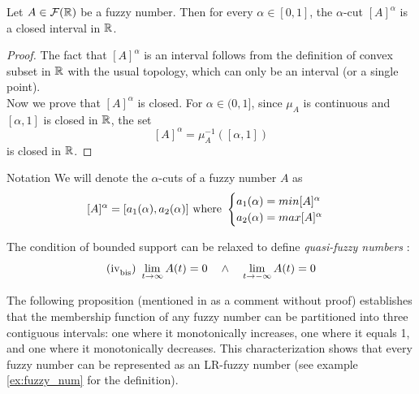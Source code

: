 \begin{proposition}
    Let $A\in \fuzzy{\R}$ be a fuzzy number. Then for every $\alpha \in [0,1]$, the $\alpha$-cut $[A]^\alpha$ is a closed interval in $\R$.
\end{proposition}

\begin{proof}
The fact that $[A]^\alpha$ is an interval follows from the definition of convex subset in $\R$ with the usual topology, which can only be an interval (or a single point).\\
Now we prove that $[A]^\alpha$ is closed. For $\alpha \in (0,1]$, since $\mu_A$ is continuous and $[\alpha, 1]$ is closed in $\R$, the set
\[
[A]^\alpha = \mu_A^{-1}([\alpha, 1])
\]
is closed in $\R$. %
\end{proof}

\begin{notation}{Notation}
    We will denote the $\alpha$-cuts of a fuzzy number $A$ as 
    \[[A]^\alpha=[a_1(\alpha),a_2(\alpha)]\textnormal{ where }\begin{cases}
        a_1(\alpha)=min[A]^\alpha&\\
        a_2(\alpha)=max[A]^\alpha&\\
    \end{cases}\]
\end{notation}

\begin{note}
The condition of bounded support can be relaxed to define \textit{quasi-fuzzy numbers} :
$$\textnormal{(iv}_{\textnormal{bis}}\textnormal{) } \lim{t}{\infty}A(t) = 0 \quad \land \quad \lim{t}{-\infty}A(t) = 0$$
\end{note}

The following proposition (mentioned in \cite[p.~3]{FULLER2} as a comment without proof) establishes that the membership function of any fuzzy number can be partitioned into three contiguous intervals: one where it monotonically increases, one where it equals 1, and one where it monotonically decreases. This characterization shows that every fuzzy number can be represented as an LR-fuzzy number (see example \ref{ex:fuzzy_num} for the definition).

